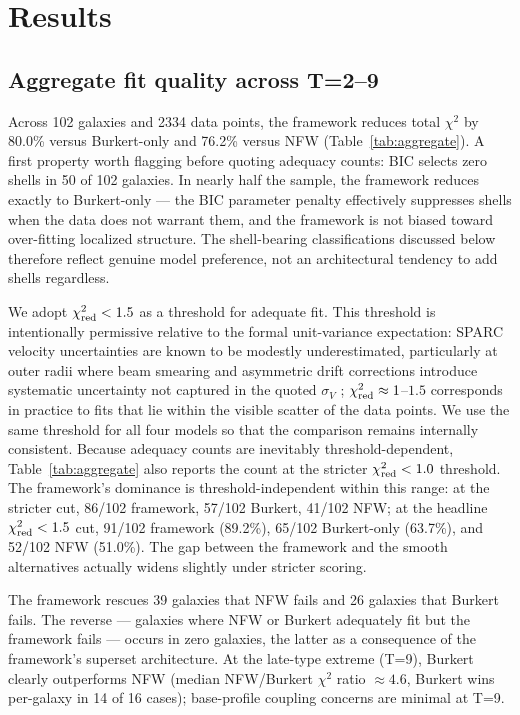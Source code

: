 \section{Results}
\label{sec:results}

\subsection{Aggregate fit quality across T=2--9}

Across 102 galaxies and 2334 data points, the framework reduces total $\chi^2$ by 80.0\% versus Burkert-only and 76.2\% versus NFW (Table~\ref{tab:aggregate}). A first property worth flagging before quoting adequacy counts: BIC selects zero shells in 50 of 102 galaxies. In nearly half the sample, the framework reduces exactly to Burkert-only --- the BIC parameter penalty effectively suppresses shells when the data does not warrant them, and the framework is not biased toward over-fitting localized structure. The shell-bearing classifications discussed below therefore reflect genuine model preference, not an architectural tendency to add shells regardless.

We adopt $\chi^2_{\rm red} < 1.5$ as a threshold for adequate fit. This threshold is intentionally permissive relative to the formal unit-variance expectation: SPARC velocity uncertainties are known to be modestly underestimated, particularly at outer radii where beam smearing and asymmetric drift corrections introduce systematic uncertainty not captured in the quoted $\sigma_V$ \citep[][\S 3.2]{Lelli2016}; $\chi^2_{\rm red} \approx 1$--$1.5$ corresponds in practice to fits that lie within the visible scatter of the data points. We use the same threshold for all four models so that the comparison remains internally consistent. Because adequacy counts are inevitably threshold-dependent, Table~\ref{tab:aggregate} also reports the count at the stricter $\chi^2_{\rm red} < 1.0$ threshold. The framework's dominance is threshold-independent within this range: at the stricter cut, 86/102 framework, 57/102 Burkert, 41/102 NFW; at the headline $\chi^2_{\rm red} < 1.5$ cut, 91/102 framework (89.2\%), 65/102 Burkert-only (63.7\%), and 52/102 NFW (51.0\%). The gap between the framework and the smooth alternatives actually widens slightly under stricter scoring.

The framework rescues 39 galaxies that NFW fails and 26 galaxies that Burkert fails. The reverse --- galaxies where NFW or Burkert adequately fit but the framework fails --- occurs in zero galaxies, the latter as a consequence of the framework's superset architecture. At the late-type extreme (T=9), Burkert clearly outperforms NFW (median NFW/Burkert $\chi^2$ ratio $\approx 4.6$, Burkert wins per-galaxy in 14 of 16 cases); base-profile coupling concerns are minimal at T=9.

